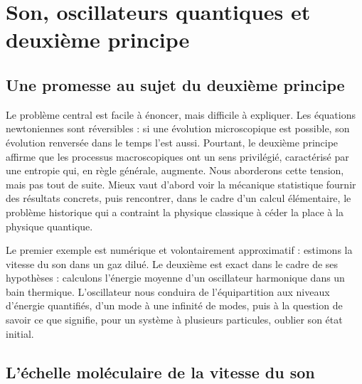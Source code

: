 \chapter{Son, oscillateurs quantiques et deuxième principe}


\section{Une promesse au sujet du deuxième principe}

Le problème central est facile à énoncer, mais difficile à expliquer. Les équations newtoniennes sont réversibles : si une évolution microscopique est possible, son évolution renversée dans le temps l’est aussi. Pourtant, le deuxième principe affirme que les processus macroscopiques ont un sens privilégié, caractérisé par une entropie qui, en règle générale, augmente. Nous aborderons cette tension, mais pas tout de suite. Mieux vaut d’abord voir la mécanique statistique fournir des résultats concrets, puis rencontrer, dans le cadre d’un calcul élémentaire, le problème historique qui a contraint la physique classique à céder la place à la physique quantique.

Le premier exemple est numérique et volontairement approximatif : estimons la vitesse du son dans un gaz dilué. Le deuxième est exact dans le cadre de ses hypothèses : calculons l’énergie moyenne d’un oscillateur harmonique dans un bain thermique. L’oscillateur nous conduira de l’équipartition aux niveaux d’énergie quantifiés, d’un mode à une infinité de modes, puis à la question de savoir ce que signifie, pour un système à plusieurs particules, oublier son état initial.

\section{L’échelle moléculaire de la vitesse du son}

